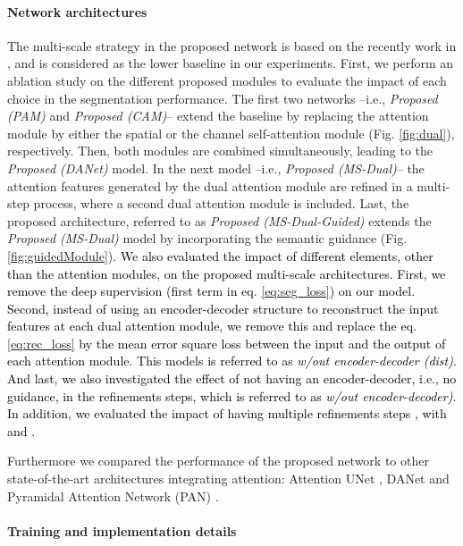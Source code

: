 \documentclass[journal]{IEEEtran}
\begin{document}
\paragraph*{\textbf{Network architectures}}
The multi-scale strategy in the proposed network is based on the recently work in \cite{wang18d}, and is considered as the lower baseline in our experiments. First, we perform an ablation study on the different proposed modules to evaluate the impact of each choice in the segmentation performance. The first two networks --i.e., \textit{Proposed (PAM)} and \textit{Proposed (CAM)}-- extend the baseline by replacing the attention module by either the spatial or the channel self-attention module (Fig. \ref{fig:dual}), respectively. Then, both modules are combined simultaneously, leading to the \textit{Proposed (DANet)} model. In the next model --i.e., \textit{Proposed (MS-Dual)}-- the attention features generated by the dual attention module are refined in a multi-step process, where a second dual attention module is included. Last, the proposed architecture, referred to as \textit{Proposed (MS-Dual-Guided)} extends the \textit{Proposed (MS-Dual)} model by incorporating the semantic guidance (Fig. \ref{fig:guidedModule}). \textcolor{black}{We also evaluated the impact of different elements, other than the attention modules, on the proposed multi-scale architectures. First, we remove the deep supervision (first term in eq. \ref{eq:seg_loss}) on our model. Second, instead of using an encoder-decoder structure to reconstruct the input features at each dual attention module, we remove this and replace the eq. \ref{eq:rec_loss} by the mean error square loss between the input and the output of each attention module. This models is referred to as \textit{w/out encoder-decoder (dist)}. And last, we also investigated the effect of not having an encoder-decoder, i.e., no guidance, in the refinements steps, which is referred to as \textit{w/out encoder-decoder)}. In addition, we evaluated the impact of having multiple refinements steps , with  and . }

Furthermore we compared the performance of the proposed network to other state-of-the-art architectures integrating attention: Attention UNet \cite{schlemper2019attention}, DANet \cite{fu2018dual} and Pyramidal Attention Network (PAN) \cite{li2018pyramid}. 

\paragraph*{\textbf{Training and implementation details}}
\end{document}
